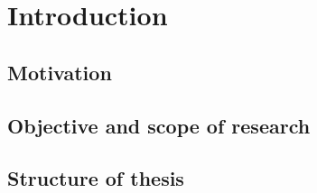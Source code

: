 \chapter{Introduction}

\section{Motivation}

\section{Objective and scope of research}

\section{Structure of thesis}
